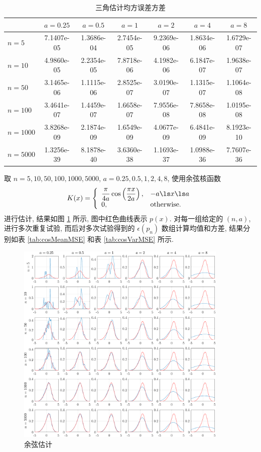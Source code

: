 \documentclass[openany]{ctexbook}
\theoremstyle{kaiti}
\theoremstyle{normal}
\begin{document}
\begin{table}[htbp]
  \centering
  \begin{tabular}{l|cccccc}
  \hline
           & $a=0.25$   & $a=0.5$    & $a=1$      & $a=2$      & $a=4$      & $a=8$      \\ \hline
  $n=5$    & 7.1407e-05 & 1.3686e-04 & 2.7454e-05 & 9.2369e-06 & 1.8634e-06 & 1.6729e-07 \\
  $n=10$   & 4.9860e-05 & 2.2354e-05 & 7.8718e-06 & 4.1982e-06 & 6.1847e-07 & 1.9638e-07 \\
  $n=50$   & 3.1465e-06 & 1.1115e-06 & 2.8525e-07 & 3.0190e-07 & 1.1315e-07 & 1.1064e-08 \\
  $n=100$  & 3.4641e-07 & 1.4459e-07 & 1.6658e-07 & 7.9556e-08 & 7.8658e-08 & 1.0195e-08 \\
  $n=1000$ & 3.8268e-09 & 2.1874e-09 & 1.6549e-09 & 4.0677e-09 & 6.4841e-09 & 8.1923e-10 \\
  $n=5000$ & 1.3256e-39 & 8.1878e-40 & 3.6360e-38 & 1.1693e-37 & 1.0988e-36 & 7.7607e-36 \\ \hline
  \end{tabular}
  \caption{三角估计均方误差方差}
  \label{tab:triVarMSE}
\end{table}

取 $n=5,10,50,100,1000,5000$, $a=0.25,0.5,1,2,4,8$, 使用余弦核函数
\begin{equation}
  K(x)=
  \left\{
    \begin{array}{ll}
      \dfrac{\pi}{4a}\cos\left(\dfrac{\pi x}{2a}\right),&-a\ls x\ls a \\
      0, & \text{otherwise.}
    \end{array}
  \right.
\end{equation} 
进行估计, 结果如图 \ref{fig:coswin} 所示, 图中红色曲线表示 $p(x)$. 对每一组给定的 $(n,a)$, 进行多次重复试验, 而后对多次试验得到的 $\epsilon(p_n)$ 数组计算均值和方差, 结果分别如表 \ref{tab:cosMeanMSE} 和表 \ref{tab:cosVarMSE} 所示.

\begin{figure}[htbp]
  \centering
  \includegraphics[width=0.9\textwidth]{cosineWindow.pdf}
  \caption{余弦估计}
  \label{fig:coswin}
\end{figure}
\end{document}
